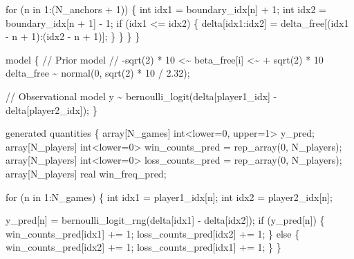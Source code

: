 \documentclass[
  letterpaper,
  DIV=11,
  numbers=noendperiod]{scrartcl}
\newenvironment{Shaded}{\begin{snugshade}}{\end{snugshade}}
\newcommand{\CommentTok}[1]{\textcolor[rgb]{0.37,0.37,0.37}{#1}}
\newcommand{\ControlFlowTok}[1]{\textcolor[rgb]{0.00,0.23,0.31}{#1}}
\newcommand{\DataTypeTok}[1]{\textcolor[rgb]{0.68,0.00,0.00}{#1}}
\newcommand{\DecValTok}[1]{\textcolor[rgb]{0.68,0.00,0.00}{#1}}
\newcommand{\FloatTok}[1]{\textcolor[rgb]{0.68,0.00,0.00}{#1}}
\newcommand{\KeywordTok}[1]{\textcolor[rgb]{0.00,0.23,0.31}{#1}}
\newcommand{\NormalTok}[1]{\textcolor[rgb]{0.00,0.23,0.31}{#1}}
\begin{document}
\begin{codelisting}
\begin{Shaded}
\begin{Highlighting}[]
    \ControlFlowTok{for}\NormalTok{ (n }\ControlFlowTok{in} \DecValTok{1}\NormalTok{:(N\_anchors + }\DecValTok{1}\NormalTok{)) \{}
      \DataTypeTok{int}\NormalTok{ idx1 = boundary\_idx[n]     + }\DecValTok{1}\NormalTok{;}
      \DataTypeTok{int}\NormalTok{ idx2 = boundary\_idx[n + }\DecValTok{1}\NormalTok{] {-} }\DecValTok{1}\NormalTok{;}
      \ControlFlowTok{if}\NormalTok{ (idx1 \textless{}= idx2) \{}
\NormalTok{        delta[idx1:idx2] = delta\_free[(idx1 {-} n + }\DecValTok{1}\NormalTok{):(idx2 {-} n + }\DecValTok{1}\NormalTok{)];}
\NormalTok{      \}}
\NormalTok{    \}}
\NormalTok{  \}}
\NormalTok{\}}

\KeywordTok{model}\NormalTok{ \{}
  \CommentTok{// Prior model}
  \CommentTok{// {-}sqrt(2) * 10 \textless{}\textasciitilde{} beta\_free[i] \textless{}\textasciitilde{} + sqrt(2) * 10}
\NormalTok{  delta\_free \textasciitilde{} normal(}\DecValTok{0}\NormalTok{, sqrt(}\DecValTok{2}\NormalTok{) * }\DecValTok{10}\NormalTok{ / }\FloatTok{2.32}\NormalTok{);}

  \CommentTok{// Observational model}
\NormalTok{  y \textasciitilde{} bernoulli\_logit(delta[player1\_idx] {-} delta[player2\_idx]);}
\NormalTok{\}}

\KeywordTok{generated quantities}\NormalTok{ \{}
  \DataTypeTok{array}\NormalTok{[N\_games] }\DataTypeTok{int}\NormalTok{\textless{}}\KeywordTok{lower}\NormalTok{=}\DecValTok{0}\NormalTok{, }\KeywordTok{upper}\NormalTok{=}\DecValTok{1}\NormalTok{\textgreater{} y\_pred;}
  \DataTypeTok{array}\NormalTok{[N\_players] }\DataTypeTok{int}\NormalTok{\textless{}}\KeywordTok{lower}\NormalTok{=}\DecValTok{0}\NormalTok{\textgreater{} win\_counts\_pred}
\NormalTok{    = rep\_array(}\DecValTok{0}\NormalTok{, N\_players);}
  \DataTypeTok{array}\NormalTok{[N\_players] }\DataTypeTok{int}\NormalTok{\textless{}}\KeywordTok{lower}\NormalTok{=}\DecValTok{0}\NormalTok{\textgreater{} loss\_counts\_pred}
\NormalTok{    = rep\_array(}\DecValTok{0}\NormalTok{, N\_players);}
  \DataTypeTok{array}\NormalTok{[N\_players] }\DataTypeTok{real}\NormalTok{ win\_freq\_pred;}

  \ControlFlowTok{for}\NormalTok{ (n }\ControlFlowTok{in} \DecValTok{1}\NormalTok{:N\_games) \{}
    \DataTypeTok{int}\NormalTok{ idx1 = player1\_idx[n];}
    \DataTypeTok{int}\NormalTok{ idx2 = player2\_idx[n];}

\NormalTok{    y\_pred[n] = bernoulli\_logit\_rng(delta[idx1] {-} delta[idx2]);}
    \ControlFlowTok{if}\NormalTok{ (y\_pred[n]) \{}
\NormalTok{      win\_counts\_pred[idx1] += }\DecValTok{1}\NormalTok{;}
\NormalTok{      loss\_counts\_pred[idx2] += }\DecValTok{1}\NormalTok{;}
\NormalTok{    \} }\ControlFlowTok{else}\NormalTok{ \{}
\NormalTok{      win\_counts\_pred[idx2] += }\DecValTok{1}\NormalTok{;}
\NormalTok{      loss\_counts\_pred[idx1] += }\DecValTok{1}\NormalTok{;}
\NormalTok{    \}}
\NormalTok{  \}}


\end{Highlighting}
\end{Shaded}
\end{codelisting}
\end{document}
